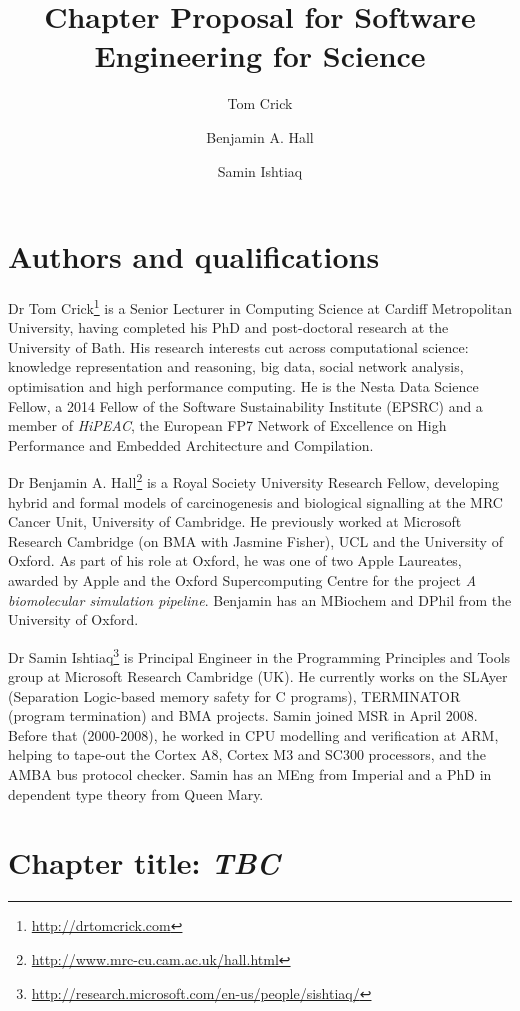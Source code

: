 \documentclass[a4paper,11pt]{article}
\title{Chapter Proposal for Software Engineering for Science}
\author[1]{Tom Crick}
\author[2]{Benjamin A. Hall}
\author[3]{Samin Ishtiaq}
\affil[1]{Department of Computing \& Information Systems, Cardiff
  Metropolitan University, UK}
\affil[2]{MRC Cancer Unit, University of Cambridge, UK}
\affil[3]{Microsoft Research Cambridge, UK}
\affil[1]{\protect\url{tcrick@cardiffmet.ac.uk}}
\affil[2]{\protect\url{bh418@mrc-cu.cam.ac.uk}}
\affil[3]{\protect\url{samin.ishtiaq@microsoft.com}}
\date{ }
\begin{document}
\maketitle


\section*{Authors and qualifications}

Dr Tom Crick\footnote{\url{http://drtomcrick.com}} is a Senior
Lecturer in Computing Science at Cardiff Metropolitan University,
having completed his PhD and post-doctoral research at the University
of Bath. His research interests cut across computational science:
knowledge representation and reasoning, big data, social network
analysis, optimisation and high performance computing. He is the
Nesta Data Science Fellow, a 2014 Fellow of the Software
Sustainability Institute (EPSRC) and a member of {\emph{HiPEAC}}, the
European FP7 Network of Excellence on High Performance and Embedded
Architecture and Compilation.

Dr Benjamin A. Hall\footnote{\url{http://www.mrc-cu.cam.ac.uk/hall.html}} is a
Royal Society University Research Fellow, developing hybrid and formal
models of carcinogenesis and biological signalling at the MRC Cancer
Unit, University of Cambridge. He previously worked at Microsoft
Research Cambridge (on BMA with Jasmine Fisher), UCL and the
University of Oxford. As part of his role at Oxford, he was one of two
Apple Laureates, awarded by Apple and the Oxford Supercomputing Centre
for the project {\emph{A biomolecular simulation pipeline}}. Benjamin
has an MBiochem and DPhil from the University of Oxford.

Dr Samin Ishtiaq\footnote{\url{http://research.microsoft.com/en-us/people/sishtiaq/}}
is Principal Engineer in the Programming Principles and Tools group at
Microsoft Research Cambridge (UK). He currently works on the SLAyer
(Separation Logic-based memory safety for C programs), TERMINATOR
(program termination) and BMA projects. Samin joined MSR in April
2008. Before that (2000-2008), he worked in CPU modelling and
verification at ARM, helping to tape-out the Cortex A8, Cortex M3 and
SC300 processors, and the AMBA bus protocol checker. Samin has an MEng
from Imperial and a PhD in dependent type theory from Queen Mary.

\section*{Chapter title: {\emph{TBC}}}
\end{document}

